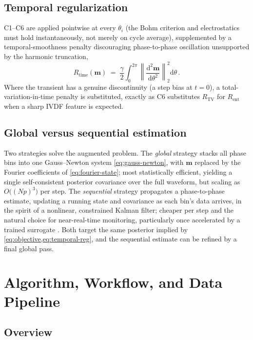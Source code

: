 \subsection{Temporal regularization}
\label{sec:pci-time-reg}

C1--C6 are applied pointwise at every $\theta_{i}$ (the Bohm criterion and electrostatics must hold instantaneously, not merely on cycle average), supplemented by a temporal-smoothness penalty discouraging phase-to-phase oscillation unsupported by the harmonic truncation,
\begin{equation}
R_{\mathrm{time}}(\mathbf m) \;=\; \frac{\gamma}{2}\int_{0}^{2\pi} \left\|\frac{\mathrm d^{2}\mathbf m}{\mathrm d\theta^{2}}\right\|_{2}^{2}\mathrm d\theta \, . \label{eq:temporal-reg}
\end{equation}
Where the transient has a genuine discontinuity (a step bias at $t=0$), a total-variation-in-time penalty is substituted, exactly as C6 substitutes $R_{\mathrm{TV}}$ for $R_{\mathrm{ent}}$ when a sharp IVDF feature is expected.

\subsection{Global versus sequential estimation}

Two strategies solve the augmented problem. The \emph{global} strategy stacks all phase bins into one Gauss--Newton system \cref{eq:gauss-newton}, with $\mathbf m$ replaced by the Fourier coefficients of \cref{eq:fourier-state}; most statistically efficient, yielding a single self-consistent posterior covariance over the full waveform, but scaling as $O\big((Np)^{3}\big)$ per step. The \emph{sequential} strategy propagates a phase-to-phase estimate, updating a running state and covariance as each bin's data arrives, in the spirit of a nonlinear, constrained Kalman filter; cheaper per step and the natural choice for near-real-time monitoring, particularly once accelerated by a trained surrogate \cite{ref0728,ref0731}. Both target the same posterior implied by \cref{eq:objective,eq:temporal-reg}, and the sequential estimate can be refined by a final global pass.

\section{Algorithm, Workflow, and Data Pipeline}
\label{sec:pci-algorithm}

\subsection{Overview}

